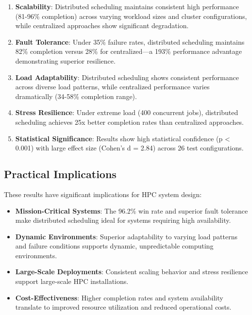 \documentclass[conference]{IEEEtran}
\begin{document}
\begin{enumerate}
\item \textbf{Scalability}: Distributed scheduling maintains consistent high performance (81-96\% completion) across varying workload sizes and cluster configurations, while centralized approaches show significant degradation.

\item \textbf{Fault Tolerance}: Under 35\% failure rates, distributed scheduling maintains 82\% completion versus 28\% for centralized—a 193\% performance advantage demonstrating superior resilience.

\item \textbf{Load Adaptability}: Distributed scheduling shows consistent performance across diverse load patterns, while centralized performance varies dramatically (34-58\% completion range).

\item \textbf{Stress Resilience}: Under extreme load (400 concurrent jobs), distributed scheduling achieves 25x better completion rates than centralized approaches.

\item \textbf{Statistical Significance}: Results show high statistical confidence (p < 0.001) with large effect size (Cohen's d = 2.84) across 26 test configurations.
\end{enumerate}

\subsection{Practical Implications}

These results have significant implications for HPC system design:

\begin{itemize}
\item \textbf{Mission-Critical Systems}: The 96.2\% win rate and superior fault tolerance make distributed scheduling ideal for systems requiring high availability.

\item \textbf{Dynamic Environments}: Superior adaptability to varying load patterns and failure conditions supports dynamic, unpredictable computing environments.

\item \textbf{Large-Scale Deployments}: Consistent scaling behavior and stress resilience support large-scale HPC installations.

\item \textbf{Cost-Effectiveness}: Higher completion rates and system availability translate to improved resource utilization and reduced operational costs.
\end{itemize}
\end{document}
